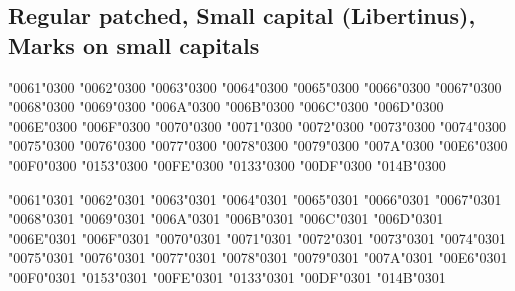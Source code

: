 \newpage
\subsection*{Regular patched, Small capital (Libertinus), Marks on small capitals}

{\LibertinusSerifPatch
\textsc{\char"0061\char"0300} \textsc{\char"0062\char"0300} \textsc{\char"0063\char"0300} \textsc{\char"0064\char"0300} \textsc{\char"0065\char"0300} \textsc{\char"0066\char"0300} \textsc{\char"0067\char"0300} \textsc{\char"0068\char"0300} \textsc{\char"0069\char"0300} \textsc{\char"006A\char"0300} \textsc{\char"006B\char"0300} \textsc{\char"006C\char"0300} \textsc{\char"006D\char"0300} \textsc{\char"006E\char"0300} \textsc{\char"006F\char"0300} \textsc{\char"0070\char"0300} \textsc{\char"0071\char"0300} \textsc{\char"0072\char"0300} \textsc{\char"0073\char"0300} \textsc{\char"0074\char"0300} \textsc{\char"0075\char"0300} \textsc{\char"0076\char"0300} \textsc{\char"0077\char"0300} \textsc{\char"0078\char"0300} \textsc{\char"0079\char"0300} \textsc{\char"007A\char"0300} \textsc{\char"00E6\char"0300} \textsc{\char"00F0\char"0300} \textsc{\char"0153\char"0300} \textsc{\char"00FE\char"0300} \textsc{\char"0133\char"0300} \textsc{\char"00DF\char"0300} \textsc{\char"014B\char"0300}

\textsc{\char"0061\char"0301} \textsc{\char"0062\char"0301} \textsc{\char"0063\char"0301} \textsc{\char"0064\char"0301} \textsc{\char"0065\char"0301} \textsc{\char"0066\char"0301} \textsc{\char"0067\char"0301} \textsc{\char"0068\char"0301} \textsc{\char"0069\char"0301} \textsc{\char"006A\char"0301} \textsc{\char"006B\char"0301} \textsc{\char"006C\char"0301} \textsc{\char"006D\char"0301} \textsc{\char"006E\char"0301} \textsc{\char"006F\char"0301} \textsc{\char"0070\char"0301} \textsc{\char"0071\char"0301} \textsc{\char"0072\char"0301} \textsc{\char"0073\char"0301} \textsc{\char"0074\char"0301} \textsc{\char"0075\char"0301} \textsc{\char"0076\char"0301} \textsc{\char"0077\char"0301} \textsc{\char"0078\char"0301} \textsc{\char"0079\char"0301} \textsc{\char"007A\char"0301} \textsc{\char"00E6\char"0301} \textsc{\char"00F0\char"0301} \textsc{\char"0153\char"0301} \textsc{\char"00FE\char"0301} \textsc{\char"0133\char"0301} \textsc{\char"00DF\char"0301} \textsc{\char"014B\char"0301}

}
